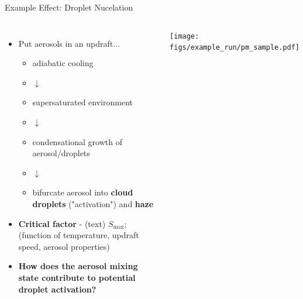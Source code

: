 \documentclass[9pt,pdf,mathserif]{beamer}
\begin{document}
\begin{frame}{Example Effect: Droplet Nucelation} %
\begin{columns}
		\begin{itemize}
		\item Put aerosols in an updraft... 
			\begin{itemize}
			\centering
			\item[] adiabatic cooling %
			\item[] $\downarrow$
			\item[] supersaturated environment
			\item[] $\downarrow$
			\item[] condensational growth of aerosol/droplets
			\item[] $\downarrow$
			\item[] bifurcate aerosol into \textbf{\color{green}cloud droplets} ("activation") and \textbf{\color{orange}haze}
			\end{itemize}
		\vspace{0.5cm}
		\item \textbf{Critical factor} -    (text) {$S_\text{max}$}; (function of temperature, updraft speed, aerosol properties)
		\vspace{0.5cm}
		\item \alert{\textbf{How does the aerosol mixing state contribute to potential droplet activation?}}
		\end{itemize}
		\texttt{[image: figs/example\_run/pm\_sample.pdf]}
\end{columns}
\end{frame}
\end{document}
